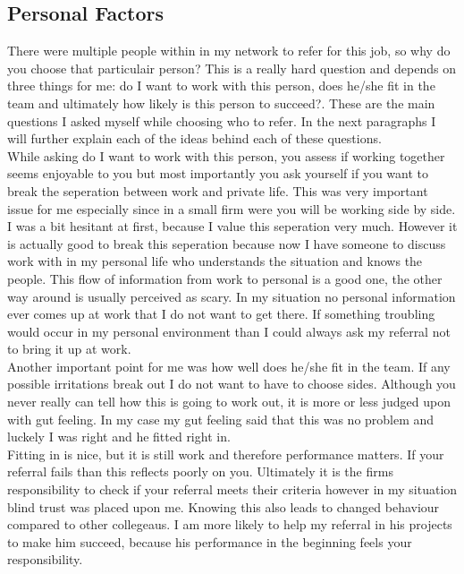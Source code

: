 \documentclass[Main.tex]{subfiles}
\begin{document}
\subsection*{Personal Factors}

There were multiple people within in my network to refer for this job, so why do you choose that particulair person? This is a really hard question and depends  on three things for me: do I want to work with this person, does he/she fit in the team and ultimately how likely is this person to succeed?. These are the main questions I asked myself while choosing who to refer. In the next paragraphs I will further explain each of the ideas behind each of these questions.\\

While asking do I want to work with this person, you assess if working together seems enjoyable to you but most importantly you ask yourself if you want to break the seperation between work and private life. This was very important issue for me especially since in a small firm were you will be working side by side. I was a bit hesitant at first, because I value this seperation very much. However it is actually good to break this seperation because now I have someone to discuss work with in my personal life who understands the situation and knows the people. This flow of information from work to personal is a good one, the other way around is usually perceived as scary. In my situation no personal information ever comes up at work that I do not want to get there. If something troubling would occur in my personal environment than I could always ask my referral not to bring it up at work. \\

Another important point for me was how well does he/she fit in the team. If any possible irritations break out I do not want to have to choose sides. Although you never really can tell how this is going to work out, it is more or less judged upon with gut feeling. In my case my gut feeling said that this was no problem and luckely I was right and he fitted right in.\\

Fitting in is nice, but it is still work and therefore performance matters. If your referral fails than this reflects poorly on you. Ultimately it is the firms responsibility to check if your referral meets their criteria however in my situation blind trust was placed upon me. Knowing this also leads to changed behaviour compared to other collegeaus. I am more likely to help my referral in his projects to make him succeed, because his performance in the beginning feels your responsibility.
\end{document}
